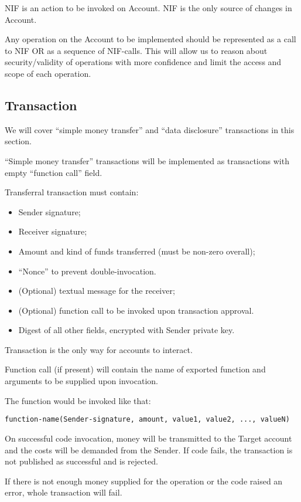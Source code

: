 NIF is an action to be invoked on Account.
NIF is the only source of changes in Account.

Any operation on the Account to be implemented should be represented as a call to NIF OR as a sequence of NIF-calls.
This will allow us to reason about security/validity of operations with more confidence and limit the access and scope of each operation.

\subsection{Transaction}

We will cover ``simple money transfer'' and ``data disclosure'' transactions in this section.

``Simple money transfer'' transactions will be implemented as transactions with empty ``function call'' field.

Transferral transaction must contain:
\begin{itemize}
  \item Sender signature;
  \item Receiver signature;
  \item Amount and kind of funds transferred (must be non-zero overall);
  \item ``Nonce'' to prevent double-invocation.
  \item (Optional) textual message for the receiver;
  \item (Optional) function call to be invoked upon transaction approval.
  \item Digest of all other fields, encrypted with Sender private key.
\end{itemize}

Transaction is the only way for accounts to interact.

Function call (if present) will contain the name of exported function and arguments to be supplied upon invocation.

The function would be invoked like that:

\begin{verbatim}
function-name(Sender-signature, amount, value1, value2, ..., valueN)
\end{verbatim}

On successful code invocation, money will be transmitted to the Target account and the costs will be demanded from the Sender.
If code fails, the transaction is not published as successful and is rejected.

If there is not enough money supplied for the operation or the code raised an error, whole transaction will fail.


